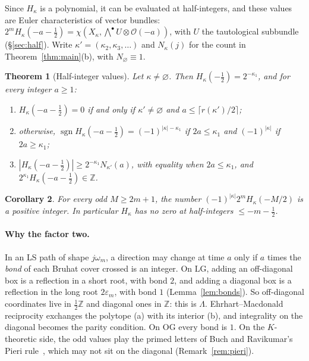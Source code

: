 \documentclass[submission]{FPSAC2027}
\newtheorem{theorem}{Theorem}[section]
\newtheorem{corollary}[theorem]{Corollary}
\theoremstyle{definition}
\theoremstyle{remark}
\newcommand{\LG}{\mathrm{LG}}
\newcommand{\OG}{\mathrm{OG}}
\newcommand{\cO}{\mathcal{O}}
\newcommand{\Z}{\mathbb{Z}}
\newcommand{\sgn}{\operatorname{sgn}}
\begin{document}
Since $H_\kappa$ is a polynomial, it can be evaluated at half-integers, and these values are
Euler characteristics of vector bundles:
$2^mH_\kappa(-a-\tfrac12)=\chi(X_\kappa,\bigwedge^\bullet U\otimes\cO(-a))$, with $U$ the
tautological subbundle (\S\ref{sec:half}). Write $\kappa'=(\kappa_2,\kappa_3,\dots)$ and
$N_\kappa(j)$ for the count in Theorem~\ref{thm:main}(b), with $N_\varnothing\equiv1$.

\begin{theorem}[Half-integer values]\label{thm:HZ}
Let $\kappa\neq\varnothing$. Then $H_\kappa(-\tfrac12)=2^{-\kappa_1}$, and for every
integer $a\ge 1$:
\begin{enumerate}[label=(\roman*)]
\item $H_\kappa(-a-\tfrac12)=0$ if and only if $\kappa'\ne\varnothing$ and
$a\le\lceil r(\kappa')/2\rceil$;
\item otherwise, $\sgn H_\kappa(-a-\tfrac12)=(-1)^{|\kappa|-\kappa_1}$ if $2a\le\kappa_1$
and $(-1)^{|\kappa|}$ if $2a\ge\kappa_1$;
\item $|H_\kappa(-a-\tfrac12)|\ge 2^{-\kappa_1}N_{\kappa'}(a)$, with equality when
$2a\le\kappa_1$, and $2^{\kappa_1}H_\kappa(-a-\tfrac12)\in\Z$.
\end{enumerate}
\end{theorem}

\begin{corollary}\label{cor:OC}
For every odd $M\ge 2m+1$, the number $(-1)^{|\kappa|}2^mH_\kappa(-M/2)$ is a positive
integer. In particular $H_\kappa$ has no zero at half-integers $\le -m-\tfrac12$.
\end{corollary}

\paragraph{Why the factor two.} In an LS path of shape $j\omega_m$, a direction may change at
time $a$ only if $a$ times the \emph{bond} of each Bruhat cover crossed is an integer. On $\LG$,
adding an off-diagonal box is a reflection in a short root, with bond $2$, and adding a diagonal
box is a reflection in the long root $2\varepsilon_m$, with bond $1$ (Lemma~\ref{lem:bonds}). So
off-diagonal coordinates live in $\tfrac12\Z$ and diagonal ones in $\Z$: this is $\Lambda$.
Ehrhart--Macdonald reciprocity exchanges the polytope (a) with its interior (b), and integrality on
the diagonal becomes the parity condition. On $\OG$ every bond is $1$. On the $K$-theoretic side,
the odd values play the primed letters of Buch and Ravikumar's Pieri rule~\cite{BR12}, which may
not sit on the diagonal (Remark~\ref{rem:pieri}).
\end{document}
